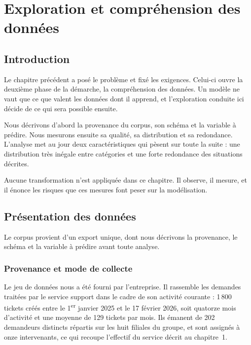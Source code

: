 \chapter{Exploration et compréhension des données}

\section*{Introduction}

Le chapitre précédent a posé le problème et fixé les exigences. Celui-ci ouvre la deuxième phase de
la démarche, la compréhension des données. Un modèle ne vaut que ce que valent les données dont il
apprend, et l'exploration conduite ici décide de ce qui sera possible ensuite.

Nous décrivons d'abord la provenance du corpus, son schéma et la variable à prédire. Nous mesurons
ensuite sa qualité, sa distribution et sa redondance. L'analyse met au jour deux caractéristiques
qui pèsent sur toute la suite : une distribution très inégale entre catégories et une forte
redondance des situations décrites.

Aucune transformation n'est appliquée dans ce chapitre. Il observe, il mesure, et il énonce les
risques que ces mesures font peser sur la modélisation.

\section{Présentation des données}

Le corpus provient d'un export unique, dont nous décrivons la provenance, le schéma et la variable
à prédire avant toute analyse.

\subsection{Provenance et mode de collecte}

\label{sec:provenance}

Le jeu de données nous a été fourni par l'entreprise. Il rassemble les demandes traitées par le
service support dans le cadre de son activité courante : 1\,800 tickets créés entre le
1\textsuperscript{er} janvier 2025 et le 17 février 2026, soit quatorze mois d'activité et une
moyenne de 129 tickets par mois. Ils émanent de 202 demandeurs distincts répartis sur les huit
filiales du groupe, et sont assignés à onze intervenants, ce qui recoupe l'effectif du service
décrit au chapitre~1.

